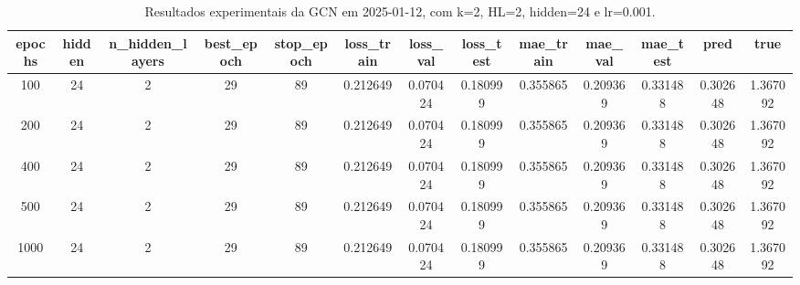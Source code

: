 \begin{table}[h]
\centering
\caption{Resultados experimentais da GCN em 2025-01-12, com k=2, HL=2, hidden=24 e lr=0.001.}
\label{tab:gcn_results_k2_hl2_h24_d20250112}
\begin{tabular}{ccccccccccccc}
\toprule
epochs & hidden & n\_hidden\_layers & best\_epoch & stop\_epoch & loss\_train & loss\_val & loss\_test & mae\_train & mae\_val & mae\_test & pred & true \\
\midrule
100 & 24 & 2 & 29 & 89 & 0.212649 & 0.070424 & 0.180999 & 0.355865 & 0.209369 & 0.331488 & 0.302648 & 1.367092 \\
200 & 24 & 2 & 29 & 89 & 0.212649 & 0.070424 & 0.180999 & 0.355865 & 0.209369 & 0.331488 & 0.302648 & 1.367092 \\
400 & 24 & 2 & 29 & 89 & 0.212649 & 0.070424 & 0.180999 & 0.355865 & 0.209369 & 0.331488 & 0.302648 & 1.367092 \\
500 & 24 & 2 & 29 & 89 & 0.212649 & 0.070424 & 0.180999 & 0.355865 & 0.209369 & 0.331488 & 0.302648 & 1.367092 \\
1000 & 24 & 2 & 29 & 89 & 0.212649 & 0.070424 & 0.180999 & 0.355865 & 0.209369 & 0.331488 & 0.302648 & 1.367092 \\
\bottomrule
\end{tabular}
\end{table}
